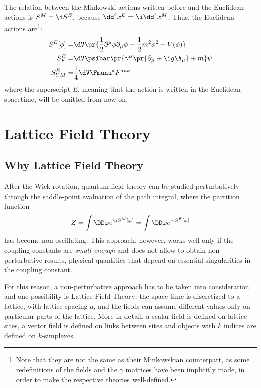 The relation between the Minkowski actions written before and the Euclidean actions is $S^M = \i S^E$, because $\dd^4x^E = \i \dd^4x^M$.
Thus, the Euclidean actions are\footnote{Note that they are not the same as their Minkowskian counterpart, as some redefinitions of the fields and the $\gamma$ matrices have been implicitly made, in order to make the respective theories well-defined.}:
\begin{align}
    S^E[\phi] =& \dV \pr{\frac12\partial^\mu\phi\partial_\mu\phi-\frac12m^2\phi^2+V(\phi)} \label{1:ScalarActionEuclidean}\\
    S^E_F =& \dV\psibar\pr{\gamma^\mu\pr{\partial_\mu+\i g \A_\mu} + m}\psi \label{1:FerionActionEuclidean}\\
    S^E_{YM} =& \frac14 \dV \Fmunu^a F^{a\mu\nu} \label{1:YMActionEuclidean}
\end{align}
where the superscript $E$, meaning that the action is written in the Euclidean spacetime, will be omitted from now on.

\section{Lattice Field Theory}
\subsection{Why Lattice Field Theory}
After the Wick rotation, quantum field theory can be studied perturbatively through the saddle-point evaluation of the path integral, where the partition function
\begin{equation*}
    Z = \int\DD\varphi e^{\i S^M[\varphi]} = \int\DD\varphi e^{-S^E[\varphi]}
\end{equation*}
has become non-oscillating.
This approach, however, works well only if the coupling constants are \emph{small enough} and does not allow to obtain non-perturbative results, \ie physical quantities that depend on essential singularities in the coupling constant.

For this reason, a non-perturbative approach has to be taken into consideration and one possibility is Lattice Field Theory: the space-time is discretized to a lattice, with lattice spacing $a$, and the fields can assume different values only on particular parts of the lattice.
More in detail, a scalar field is defined on lattice sites, a vector field is defined on links between sites and objects with $k$ indices are defined on $k$-simplexes.

